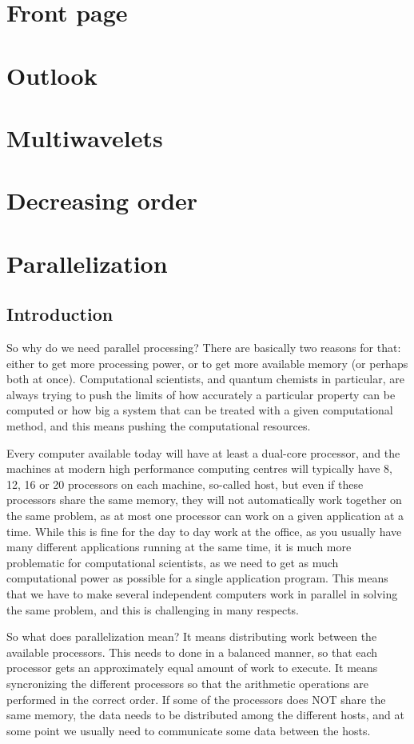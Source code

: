
\section{Front page}
\section{Outlook}
\section{Multiwavelets}
\section{Decreasing order}
\section{Parallelization}
\subsection{Introduction}
So why do we need parallel processing? There are basically two reasons for that: either to
get more processing power, or to get more available memory (or perhaps both at once). 
Computational scientists, and quantum chemists in particular, are always trying to push the 
limits of how accurately a particular property can be computed or how big a system that can 
be treated with a given computational method, and this means pushing the computational resources.

Every computer available today will have at least a dual-core processor, and the machines at
modern high performance computing centres will typically have 8, 12, 16 or 20 processors
on each machine, so-called host, but even if these processors share the same memory, they
will not automatically work together on the same problem, as at most one processor can 
work on a given application at a time. While this is fine for the day to day work at the 
office, as you usually have many different applications running at the same time, it is much 
more problematic for computational scientists, as we need to get as much computational power 
as possible for a single application program. This means that we have to make several 
independent computers work in parallel in solving the same problem, and this is challenging 
in many respects. 

So what does parallelization mean? It means distributing work between the available processors.
This needs to done in a balanced manner, so that each processor gets an approximately equal 
amount of work to execute. It means syncronizing the different processors so that the arithmetic
operations are performed in the correct order. If some of the processors does NOT share the same
memory, the data needs to be distributed among the different hosts, and at some point we usually
need to communicate some data between the hosts.


